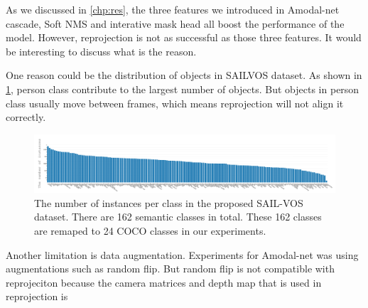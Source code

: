 As we discussed in \ref{chp:res}, the three features we introduced in Amodal-net \ie cascade, Soft NMS and interative mask head all boost the performance of the model. However, reprojection is not as successful as those three features. It would be interesting to discuss what is the reason.

One reason could be the distribution of objects in SAILVOS dataset. As shown in \ref{fig:sailvos_cls}, person class contribute to the largest number of objects. But objects in person class usually move between frames, which means reprojection will not align it correctly.

\begin{figure}[t]
\centering
\includegraphics[scale=0.4]{fig/sailvos_cls_dist.png}

\caption{The number of instances per class in the proposed SAIL-VOS dataset. There are 162 semantic classes in total. These 162 classes are remaped to 24 COCO classes in our experiments. }
\label{fig:sailvos_cls}
\end{figure}

Another limitation is data augmentation. Experiments for Amodal-net was using augmentations such as random flip. But random flip is not compatible with reprojeciton because the camera matrices and depth map that is used in reprojection is 